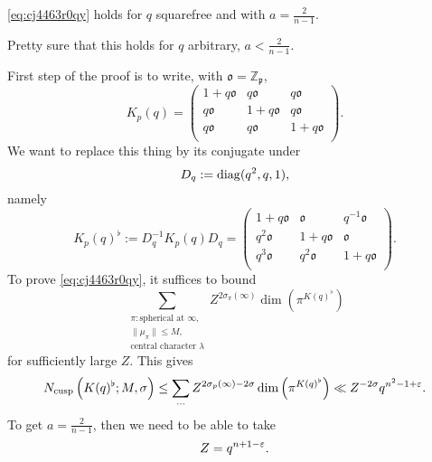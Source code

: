 \documentclass[reqno]{amsart} 
\begin{document}
\begin{theorem}
\eqref{eq:cj4463r0qy} holds for $q$ squarefree and with $a = \frac{2}{n - 1}$.  
\end{theorem}
\begin{theorem}[2023+]
Pretty sure that this holds for $q$ arbitrary, $a < \frac{2}{n-1}$.
\end{theorem}
First step of the proof is to write, with $\mathfrak{o} = \mathbb{Z}_\mathfrak{p}$,
\begin{equation*}
K_p (q) =
\begin{pmatrix}
1 + q \mathfrak{o}   & q \mathfrak{o}  &  q \mathfrak{o}  \\
q \mathfrak{o}  & 1 + q \mathfrak{o}  & q \mathfrak{o}  \\
q \mathfrak{o}  & q \mathfrak{o}  & 1 + q \mathfrak{o}  \\
\end{pmatrix}.
\end{equation*}
We want to replace this thing by its conjugate under
\begin{equation*}
D_q := \operatorname{diag} (q^2, q, 1),
\end{equation*}
namely
\begin{equation*}
  K_p (q)^\flat :=
  D_q^{-1} K_p (q) D_q
  =
  \begin{pmatrix}
1 + q \mathfrak{o}  &  \mathfrak{o}  &  q^{-1} \mathfrak{o}  \\
q^2 \mathfrak{o}  & 1 + q \mathfrak{o}  &  \mathfrak{o}  \\
q^3 \mathfrak{o}  & q^2 \mathfrak{o}  & 1 + q \mathfrak{o} \\
\end{pmatrix}.
\end{equation*}
To prove \eqref{eq:cj4463r0qy}, it suffices to bound
\begin{equation}\label{eq:cj4467j3w4}
  \sum_{
    \substack{
      \pi : \text{spherical at } \infty,  \\
      \lVert \mu_\pi  \rVert \leq M, \\
      \text{central character }\lambda 
    }
  }
  Z^{2 \sigma_\pi (\infty) }
  \dim \left( \pi^{K (q)^{\flat}} \right)
\end{equation}
for sufficiently large $Z$.  This gives
\begin{equation*}
  N_{\operatorname{cusp}} \left( K (q)^\flat ; M, \sigma  \right)
  \leq
  \sum_{\dotsb } Z^{2 \sigma_p (\infty) - 2 \sigma }
  \dim \left( \pi^{K (q)^\flat } \right)
  \ll
  Z^{- 2 \sigma } q^{n^2 - 1 + \varepsilon}.
\end{equation*}
To get $a = \frac{2}{n - 1}$, then we need to be able to take
\begin{equation*}
Z = q^{n + 1 - \varepsilon}.
\end{equation*}
\end{document}
